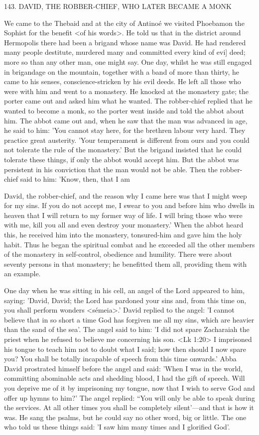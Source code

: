143. DAVID, THE ROBBER-CHIEF, WHO LATER
BECAME A MONK

We came to the Thebaid and at the city of Antinoé we visited
Phoebamon the Sophist for the benefit <of his words>. He told us
that in the district around Hermopolis there had been a brigand
whose name was David. He had rendered many people destitute,
murdered many and committed every kind of evi] deed; more so
than any other man, one might say. One day, whilst he was still
engaged in brigandage on the mountain, together with a band of
more than thirty, he came to his senses, conscience-stricken by his
evil deeds. He left all those who were with him and went to a
monastery. He knocked at the monastery gate; the porter came out
and asked him what he wanted. The robber-chief replied that he
wanted to become a monk, so the porter went inside and told the
abbot about him. The abbot came out and, when he saw that the
man was advanced in age, he said to him: 'You cannot stay here,
for the brethren labour very hard. They practice great austerity.
'Your temperament is different from ours and you could not tolerate
the rule of the monastery.' But the brigand insisted that he could
tolerate these things, if only the abbot would accept him. But the
abbot was persistent in his conviction that the man would not be
able. Then the robber-chief said to him: 'Know, then, that I am

David, the robber-chief, and the reason why I came here was that
I might weep for my sins. If you do not accept me, I swear to you
and before him who dwells in heaven that I will return to my
former way of life. I will bring those who were with me, kill you all
and even destroy your monastery.' When the abbot heard this, he
received him into the monastery, tonsured-him and gave him the
holy habit. Thus he began the spiritual combat and he exceeded all
the other members of the monastery in self-control, obedience and
humility. There were about seventy persons in that monastery; he
benefitted them all, providing them with an example.

One day when he was sitting in his cell, an angel of the Lord
appeared to him, saying: 'David, David; the Lord has pardoned
your sins and, from this time on, you shall perform wonders
<sémeia>.' David replied to the angel: 'I cannot believe that in so
short a time God has forgiven me all my sins, which are heavier
than the sand of the sea'. The angel said to him: 'I did not spare
Zacharaiah the priest when he refused to believe me concerning his
son. <Lk 1:20> I imprisoned his tongue to teach him not to doubt
what I said; how then should I now spare you? You shall be totally
incapable of speech from this time onwards.' Abba David prostrated
himself before the angel and said: 'When I was in the world,
committing abominable acts and shedding blood, I had the gift of
speech. Will you deprive me of it by imprisoning my tongue, now
that I wish to serve God and offer up hymns to him?' The angel
replied: “You will only be able to speak during the services. At all
other times you shall be completely silent'—and that is how it was.
He sang the psalms, but he could say no other word, big or little.
The one who told us these things said: 'I saw him many times and
I glorified God'.


